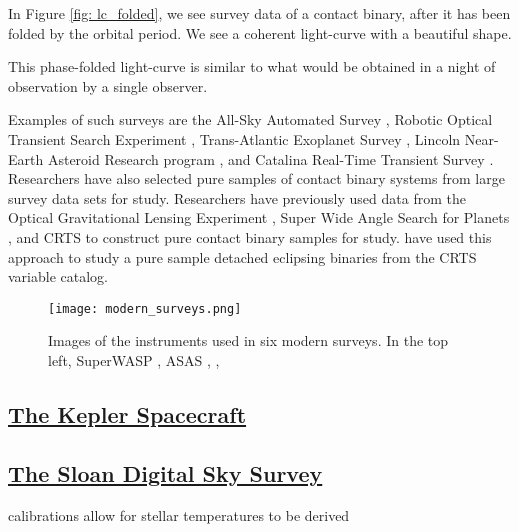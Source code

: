 \documentclass[12pt]{article} %
\numberwithin{equation}{section} %
\begin{document}
In Figure \ref{fig: lc_folded}, we see survey data of a contact binary, after it has been folded by the orbital period. We see a coherent light-curve with a beautiful shape.

This phase-folded light-curve is similar to what would be obtained in a night of observation by a single observer.

Examples of such surveys are the All-Sky Automated Survey \citep[ASAS,][]{pojmanski2000all}, Robotic Optical Transient Search Experiment \citep[ROTSE,][]{akerlof2000rotse}, Trans-Atlantic Exoplanet Survey \citep[TrES,][]{devor2008identification}, Lincoln Near-Earth Asteroid Research program \citep[LINEAR,][]{palaversa2013exploring}, and Catalina Real-Time Transient Survey \citep[CRTS,][]{drake2014catalina}. Researchers have also selected pure samples of contact binary systems from large survey data sets for study. Researchers have previously used data from the Optical Gravitational Lensing Experiment \citep[OGLE,][]{rucinski1996eclipsing}, Super Wide Angle Search for Planets \citep[SuperWASP,][]{norton2011short}, and CRTS \citep{drake2014ultra} to construct pure contact binary samples for study. \citet{lee2015properties} have used this approach to study a pure sample detached eclipsing binaries from the CRTS variable catalog. 

\begin{figure}[H]
\centering
\texttt{[image: modern\_surveys.png]}
\caption{Images of the instruments used in six modern surveys. In the top left, SuperWASP \citep[SuperWASP,][]{norton2011short}, ASAS \citep[ASAS,][]{pojmanski2000all}, \citep[ROTSE,][]{akerlof2000rotse},  }
\label{fig: modern_surveys}
\end{figure}


\subsection[The Kepler Spacecraft]{\hyperlink{toc}{The Kepler Spacecraft}}

\subsection[The Sloan Digital Sky Survey]{\hyperlink{toc}{The Sloan Digital Sky Survey}}

\cite{york2000sloan}

\citep{ivezic2007sloan} 

calibrations allow for stellar temperatures to be derived \cite{fukugita2011characterization}
\end{document}
